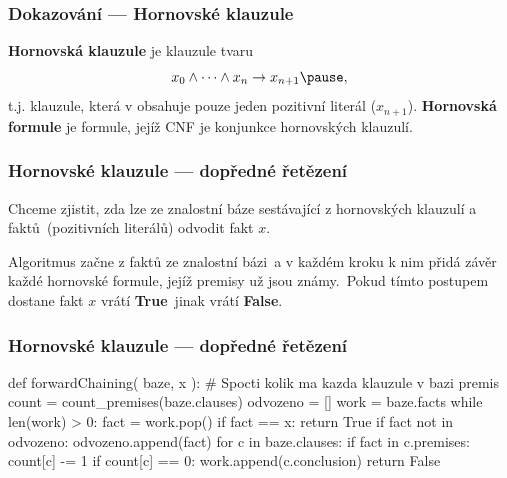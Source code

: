 \documentclass[red,professionalfont]{beamer}
\theoremstyle{definition}
\newcommand{\0}{\mbox{${\bf 0}$}}
\renewcommand{\emph}[1]{{\bf #1}}
\begin{document}
% 
% 



\begin{frame}\frametitle{Dokazování --- Hornovské klauzule}
\emph{Hornovská klauzule} je klauzule tvaru\pause
\begin{displaymath}
 x_0\wedge\cdots \wedge x_n\rightarrow x_{n+1}\pause,
\end{displaymath}
t.j. klauzule, která v obsahuje pouze jeden pozitivní literál ($x_{n+1}$).\pause
\vskip1cm
\emph{Hornovská formule} je formule, jejíž CNF je konjunkce hornovských klauzulí.
\end{frame}

\begin{frame}[fragile]\frametitle{Hornovské klauzule --- dopředné řetězení}
\begin{block}{}
 Chceme zjistit, zda lze ze znalostní báze sestávající z hornovských klauzulí a faktů\pause\ (pozitivních literálů) 
 odvodit fakt $x$.
\end{block}\pause
Algoritmus začne z faktů ze znalostní bázi\pause\ a v každém kroku k nim přidá závěr každé hornovské formule, jejíž premisy už jsou známy.\pause\
Pokud tímto postupem dostane fakt $x$ vrátí \emph{True}\pause\ jinak vrátí \emph{False}.
\end{frame}

\begin{frame}[fragile]\frametitle{Hornovské klauzule --- dopředné řetězení}
\begin{python}
def forwardChaining( baze, x ):
  # Spocti kolik ma kazda klauzule v bazi premis
  count = count_premises(baze.clauses)
  odvozeno = []
  work = baze.facts
  while len(work) > 0:
    fact = work.pop()
    if fact == x: return True
    if fact not in odvozeno:
      odvozeno.append(fact)
      for c in baze.clauses:
        if fact in c.premises:
          count[c] -= 1
          if count[c] == 0:
            work.append(c.conclusion)
  return False
\end{python}
\end{frame}
\end{document}
